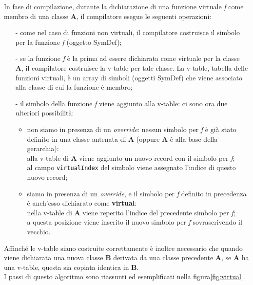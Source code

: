 \documentclass[a4paper, 11pt]{article}
\newcommand{\code}[1]{\scriptsize{\texttt{#1}}\normalsize}
\begin{document}
In fase di compilazione, durante la dichiarazione di una funzione virtuale \emph{f} come membro di una classe \textbf{A}, il compilatore esegue le seguenti operazioni:

\begin{itemize}
\item[-] come nel caso di funzioni non virtuali, il compilatore costruisce il simbolo per la funzione \emph{f} (oggetto SymDef);
\item[-] se la funzione \emph{f} \`e la prima ad essere dichiarata come virtuale per la classe \textbf{A}, il compilatore costruisce la v-table per tale classe. La v-table, tabella delle funzioni virtuali, \`e un array di simboli (oggetti SymDef) che viene associato alla classe di cui la funzione \`e membro;
\item[-] il simbolo della funzione \emph{f} viene aggiunto alla v-table: ci sono ora due ulteriori possibilit\`a:
\begin{itemize}
\item non siamo in presenza di un \emph{override}: nessun simbolo per \emph{f} \`e gi\`a stato definito in una classe antenata di \textbf{A} (oppure \textbf{A} \`e alla base della gerarchia):\\
alla v-table di \textbf{A} viene aggiunto un nuovo record con il simbolo per \emph{f};\\
al campo \code{virtualIndex} del simbolo viene assegnato l'indice di questo nuovo record;

\item siamo in presenza di un \emph{override}, e il simbolo per \emph{f}  definito in precedenza \`e anch'esso dichiarato come \textbf{virtual}:\\
nella v-table di \textbf{A} viene reperito l'indice del precedente simbolo per \emph{f};\\
a questa posizione viene inserito il nuovo simbolo per \emph{f} sovrascrivendo il vecchio.\\
\end{itemize}
\end{itemize}
Affinch\'e le v-table siano costruite correttamente \`e inoltre necessario che quando viene dichiarata una nuova classe \textbf{B} derivata da una classe precedente \textbf{A}, se \textbf{A} ha una v-table, questa sia copiata identica in \textbf{B}.\\
I passi di questo algoritmo sono riassunti ed esemplificati nella figura\ref{fig:virtual}.
\end{document}
